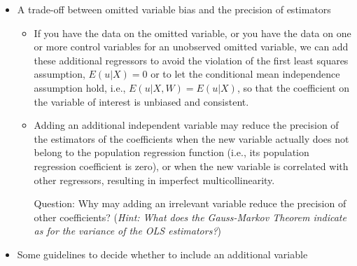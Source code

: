 \documentclass[a4paper,11pt]{article}
\begin{document}
\begin{itemize}
\item A trade-off between omitted variable bias and the precision of estimators
\label{sec:orgfe05d91}
\begin{itemize}
\item If you have the data on the omitted variable, or you have the data
on one or more control variables for an unobserved omitted variable,
we can add these additional regressors to avoid the violation of the
first least squares assumption, \(E(u | X ) = 0\) or to let the
conditional mean independence assumption hold, i.e., \(E(u|X, W) =
  E(u|X)\), so that the coefficient on the variable of interest is
unbiased and consistent.

\item Adding an additional independent variable may reduce the precision of the
estimators of the coefficients when the new variable actually does
not belong to the population regression function (i.e., its
population regression coefficient is zero), or when the new variable
is correlated with other regressors, resulting in imperfect
multicollinearity. 

Question: Why may adding an irrelevant variable reduce the precision of other
coefficients? (\emph{Hint: What does the Gauss-Markov Theorem indicate as
for the variance of the OLS estimators?})
\end{itemize}

\item Some guidelines to decide whether to include an additional variable
\label{sec:orga6da27a}


\end{itemize}
\end{document}
